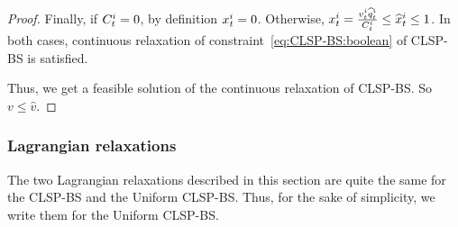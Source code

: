 \begin{proof}
Finally, if $C_t^i=0$, by definition $x_t^i=0$. Otherwise, $x_t^i=\frac{v_t^i\widehat{q}_t^i}{C_t^i}\le\widehat{x}_t^i\le 1$. In both cases, continuous relaxation of constraint~\eqref{eq:CLSP-BS:boolean} of CLSP-BS is satisfied.

Thus, we get a feasible solution of the continuous relaxation of CLSP-BS. So $v \le \widehat{v}$.
\end{proof}



\subsubsection{Lagrangian relaxations}


The two Lagrangian relaxations described in this section are quite the same for the CLSP-BS and the Uniform CLSP-BS. Thus, for the sake of simplicity, we write them for the Uniform CLSP-BS.


